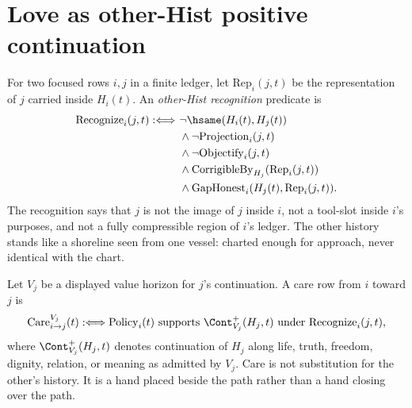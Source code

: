 \section{Love as other-Hist positive continuation}
\label{sec:consciousness-universe-love-other-hist-continuation}

\begin{definition}
\label{def:consciousness-universe-other-hist-recognition}
For two focused rows $i,j$ in a finite ledger, let $\mathrm{Rep}_i(j,t)$ be the representation of $j$ carried inside $H_i(t)$. An \emph{other-Hist recognition} predicate is
$$
\begin{aligned}
\mathrm{Recognize}_i(j,t)
:\Longleftrightarrow\ &
\neg\hsame(H_i(t),H_j(t))\\
&{}\wedge \neg\mathrm{Projection}_i(j,t)\\
&{}\wedge \neg\mathrm{Objectify}_i(j,t)\\
&{}\wedge \mathrm{CorrigibleBy}_{H_j}(\mathrm{Rep}_i(j,t))\\
&{}\wedge \mathrm{GapHonest}_i(H_j(t),\mathrm{Rep}_i(j,t)).
\end{aligned}
$$
The recognition says that $j$ is not the image of $j$ inside $i$, not a tool-slot inside $i$'s purposes, and not a fully compressible region of $i$'s ledger. The other history stands like a shoreline seen from one vessel: charted enough for approach, never identical with the chart.
\end{definition}

\begin{definition}
\label{def:consciousness-universe-positive-continuation-care}
Let $V_j$ be a displayed value horizon for $j$'s continuation. A care row from $i$ toward $j$ is
$$
\mathrm{Care}^{V_j}_{i\to j}(t)
:\Longleftrightarrow
\mathrm{Policy}_i(t)\ \mathrm{supports}\ \Cont^+_{V_j}(H_j,t)
\ \mathrm{under}\ \mathrm{Recognize}_i(j,t),
$$
where $\Cont^+_{V_j}(H_j,t)$ denotes continuation of $H_j$ along life, truth, freedom, dignity, relation, or meaning as admitted by $V_j$. Care is not substitution for the other's history. It is a hand placed beside the path rather than a hand closing over the path.
\end{definition}

